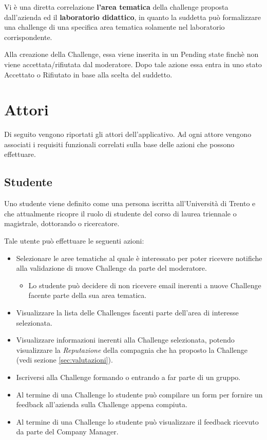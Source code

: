 Vi è una diretta correlazione \textbf{l'area tematica} della challenge proposta dall'azienda ed il \textbf{laboratorio didattico}, in quanto la suddetta può formalizzare una challenge di una specifica area tematica solamente nel laboratorio corrispondente.

Alla creazione della Challenge, essa viene inserita in un Pending state finchè non viene accettata/rifiutata dal moderatore. Dopo tale azione essa entra in uno stato Accettato o Rifiutato in base alla scelta del suddetto.

\section{Attori}
Di seguito vengono riportati gli attori dell'applicativo. Ad ogni attore vengono associati i requisiti funzionali correlati sulla base delle azioni che possono effettuare.

\subsection{Studente}
Uno studente viene definito come una persona iscritta all'Università di Trento e che attualmente ricopre il ruolo di studente del corso di laurea triennale o magistrale, dottorando o ricercatore.

Tale utente può effettuare le seguenti azioni:

\begin{itemize}
    \item Selezionare le aree tematiche al quale è interessato per poter ricevere notifiche alla validazione di nuove Challenge da parte del moderatore.
        \begin{itemize}
            \item Lo studente può decidere di non ricevere email inerenti a nuove Challenge facente parte della sua area tematica.
        \end{itemize}
    \item Visualizzare la lista delle Challenges facenti parte dell'area di interesse selezionata.
    \item Visualizzare informazioni inerenti alla Challenge selezionata, potendo visualizzare la \textit{Reputazione} della compagnia che ha proposto la Challenge (vedi sezione \ref{sec:valutazioni}).
    \item Iscriversi alla Challenge formando o entrando a far parte di un gruppo.
    \item Al termine di una Challenge lo studente può compilare un form per fornire un feedback all'azienda sulla Challenge appena compiuta. 
    \item Al termine di una Challenge lo studente può visualizzare il feedback ricevuto da parte del Company Manager.
\end{itemize}

